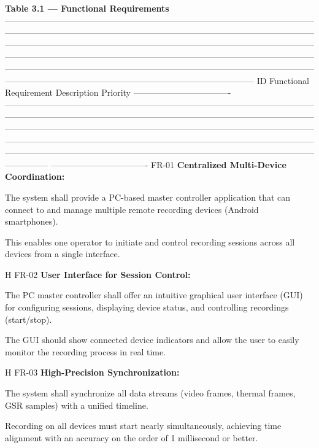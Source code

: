 \textbf{Table 3.1 --- Functional Requirements}
 ---------------------------------------------------------------------------------------------------------------------------------------------------------------------------------------------------------------------------------------------------------------------------------------------------------------------------------------------------------------------------------------------------------------------------------------------------------------------------------------------------------------------------------------------------------------------------------------------------------------------------------------------------
 ID Functional Requirement Description Priority ----------------------------------
 ---------------------------------------------------------------------------------------------------------------------------------------------------------------------------------------------------------------------------------------------------------------------------------------------------------------------------------------------------------------------------------------------------------------------------------------------------------------------------------------------------------------------------------------------------------------------------
 ---------------------------------- FR-01 \textbf{Centralized Multi-Device
 Coordination:}

The system shall provide a PC-based master controller application that can connect to
and manage multiple remote recording devices (Android smartphones).

This enables one operator to initiate and control recording sessions across all
devices from a single interface.

H FR-02 \textbf{User Interface for Session Control:}

The PC master controller shall offer an intuitive graphical user interface (GUI) for
configuring sessions, displaying device status, and controlling recordings
(start/stop).

The GUI should show connected device indicators and allow the user to easily monitor
the recording process in real time.

H FR-03 \textbf{High-Precision Synchronization:}

The system shall synchronize all data streams (video frames, thermal frames, GSR
samples) with a unified timeline.

Recording on all devices must start nearly simultaneously, achieving time alignment
with an accuracy on the order of 1 millisecond or better.

